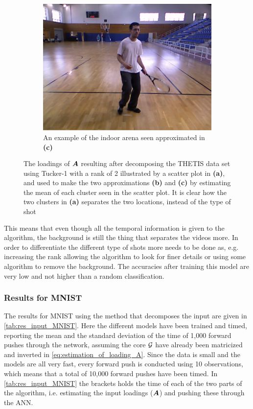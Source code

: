 \begin{figure}
\begin{subfigure}{.35\linewidth}
        \centering
        \captionsetup{width=.95\linewidth}
        \includegraphics[width=.78\linewidth]{Pics/06_results/loc_2_real.png}
        \caption{An example of the indoor arena seen approximated in \textbf{(c)}}
    \end{subfigure}
    \caption{The loadings of $\boldsymbol{A}$ resulting after decomposing the THETIS data set using Tucker-1 with a rank of 2 illustrated by a scatter plot in \textbf{(a)}, and used to make the two approximations \textbf{(b)} and \textbf{(c)} by estimating the mean of each cluster seen in the scatter plot. It is clear how the two clusters in \textbf{(a)} separates the two locations, instead of the type of shot}
    \label{fig:scatter_plot_THETIS}
\end{figure}
This means that even though all the temporal information is given to the algorithm, the background is still the thing that separates the videos more. In order to differentiate the different type of shots more needs to be done as, e.g. increasing the rank allowing the algorithm to look for finer details or using some algorithm to remove the background. The accuracies after training this model are very low and not higher than a random classification.

\subsubsection{Results for MNIST}
The results for MNIST using the method that decomposes the input are given in \autoref{tab:res_input_MNIST}. Here the different models have been trained and timed, reporting the mean and the standard deviation of the time of 1,000 forward pushes through the network, assuming the core $\mathcal{G}$ have already been matricized and inverted in \eqref{eq:estimation_of_loading_A}. Since the data is small and the models are all very fast, every forward push is conducted using 10 observations, which means that a total of 10,000 forward pushes have been timed. In \autoref{tab:res_input_MNIST}
the brackets holds the time of each of the two parts of the algorithm, i.e. estimating the input loadings ($\boldsymbol{A}$) and pushing these through the ANN. 

